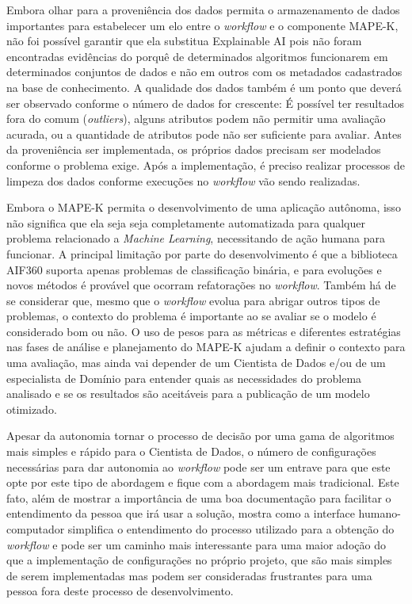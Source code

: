 \documentclass[portugues]{ic-tese}
\begin{document}
Embora olhar para a proveniência dos dados permita o armazenamento de dados importantes para estabelecer um elo entre o \textit{workflow} e o componente MAPE-K, não foi possível garantir que ela substitua Explainable AI pois não foram encontradas evidências do porquê de determinados algoritmos funcionarem em determinados conjuntos de dados e não em outros com os metadados cadastrados na base de conhecimento. A qualidade dos dados também é um ponto que deverá ser observado conforme o número de dados for crescente: É possível ter resultados fora do comum (\textit{outliers}), alguns atributos podem não permitir uma avaliação acurada, ou a quantidade de atributos pode não ser suficiente para avaliar. Antes da proveniência ser implementada, os próprios dados precisam ser modelados conforme o problema exige. Após a implementação, é preciso realizar processos de limpeza dos dados conforme execuções no \textit{workflow} vão sendo realizadas.

Embora o MAPE-K permita o desenvolvimento de uma aplicação autônoma, isso não significa que ela seja seja completamente automatizada para qualquer problema relacionado a \textit{Machine Learning}, necessitando de ação humana para funcionar. A principal limitação por parte do desenvolvimento é que a biblioteca AIF360 suporta apenas problemas de classificação binária, e para evoluções e novos métodos é provável que ocorram refatorações no \textit{workflow}. Também há de se considerar que, mesmo que o \textit{workflow} evolua para abrigar outros tipos de problemas, o contexto do problema é importante ao se avaliar se o modelo é considerado bom ou não. O uso de pesos para as métricas e diferentes estratégias nas fases de análise e planejamento do MAPE-K ajudam a definir o contexto para uma avaliação, mas ainda vai depender de um Cientista de Dados e/ou de um especialista de Domínio para entender quais as necessidades do problema analisado e se os resultados são aceitáveis para a publicação de um modelo otimizado.

Apesar da autonomia tornar o processo de decisão por uma gama de algoritmos mais simples e rápido para o Cientista de Dados, o número de configurações necessárias para dar autonomia ao \textit{workflow} pode ser um entrave para que este opte por este tipo de abordagem e fique com a abordagem mais tradicional. Este fato, além de mostrar a importância de uma boa documentação para facilitar o entendimento da pessoa que irá usar a solução, mostra como a interface humano-computador simplifica o entendimento do processo utilizado para a obtenção do \textit{workflow} e pode ser um caminho mais interessante para uma maior adoção do que a implementação de configurações no próprio projeto, que são mais simples de serem implementadas mas podem ser consideradas frustrantes para uma pessoa fora deste processo de desenvolvimento.
\end{document}
